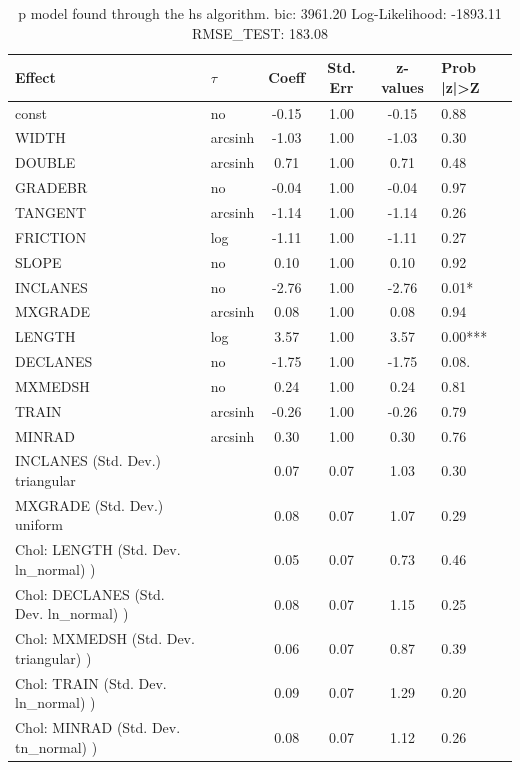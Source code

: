 \begin{table}
	\caption{p model found through the hs algorithm. bic: 3961.20 Log-Likelihood: -1893.11 RMSE_TEST: 183.08}
	\begin{center}
		\begin{tabular}{|l|l|c|c|c|l|}
			\hline
			Effect & $\tau$ & Coeff & Std. Err & z-values & Prob |z|>Z \\
			\hline
			const & no & -0.15 & 1.00 & -0.15 & 0.88 \\
			\hline
			WIDTH & arcsinh & -1.03 & 1.00 & -1.03 & 0.30 \\
			\hline
			DOUBLE & arcsinh & 0.71 & 1.00 & 0.71 & 0.48 \\
			\hline
			GRADEBR & no & -0.04 & 1.00 & -0.04 & 0.97 \\
			\hline
			TANGENT & arcsinh & -1.14 & 1.00 & -1.14 & 0.26 \\
			\hline
			FRICTION & log & -1.11 & 1.00 & -1.11 & 0.27 \\
			\hline
			SLOPE & no & 0.10 & 1.00 & 0.10 & 0.92 \\
			\hline
			INCLANES & no & -2.76 & 1.00 & -2.76 & 0.01* \\
			\hline
			MXGRADE & arcsinh & 0.08 & 1.00 & 0.08 & 0.94 \\
			\hline
			LENGTH & log & 3.57 & 1.00 & 3.57 & 0.00*** \\
			\hline
			DECLANES & no & -1.75 & 1.00 & -1.75 & 0.08. \\
			\hline
			MXMEDSH & no & 0.24 & 1.00 & 0.24 & 0.81 \\
			\hline
			TRAIN & arcsinh & -0.26 & 1.00 & -0.26 & 0.79 \\
			\hline
			MINRAD & arcsinh & 0.30 & 1.00 & 0.30 & 0.76 \\
			\hline
			INCLANES (Std. Dev.) triangular &  & 0.07 & 0.07 & 1.03 & 0.30 \\
			\hline
			MXGRADE (Std. Dev.) uniform &  & 0.08 & 0.07 & 1.07 & 0.29 \\
			\hline
			 Chol: LENGTH (Std. Dev. ln_normal) ) &  & 0.05 & 0.07 & 0.73 & 0.46 \\
			\hline
			 Chol: DECLANES (Std. Dev. ln_normal) ) &  & 0.08 & 0.07 & 1.15 & 0.25 \\
			\hline
			 Chol: MXMEDSH (Std. Dev. triangular) ) &  & 0.06 & 0.07 & 0.87 & 0.39 \\
			\hline
			 Chol: TRAIN (Std. Dev. ln_normal) ) &  & 0.09 & 0.07 & 1.29 & 0.20 \\
			\hline
			 Chol: MINRAD (Std. Dev. tn_normal) ) &  & 0.08 & 0.07 & 1.12 & 0.26 \\

\end{tabular}
\end{center}
\end{table}

